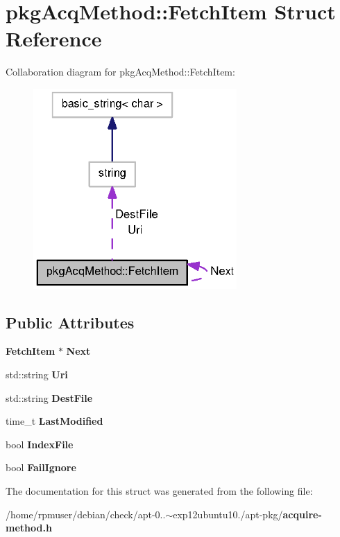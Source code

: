\section{pkg\-Acq\-Method\-:\-:\-Fetch\-Item \-Struct \-Reference}
\label{structpkgAcqMethod_1_1FetchItem}


\-Collaboration diagram for pkg\-Acq\-Method\-:\-:\-Fetch\-Item\-:
\nopagebreak
\begin{figure}[H]
\begin{center}
\leavevmode
\includegraphics[width=220pt]{structpkgAcqMethod_1_1FetchItem__coll__graph}
\end{center}
\end{figure}
\subsection*{\-Public \-Attributes}
\begin{DoxyCompactItemize}
\item 
{\bf \-Fetch\-Item} $\ast$ {\bfseries \-Next}\label{structpkgAcqMethod_1_1FetchItem_a0b400807757f51009e37acd1b0f70d28}

\item 
std\-::string {\bfseries \-Uri}\label{structpkgAcqMethod_1_1FetchItem_a6e12b4b4ffa66bc62635ba43728a446d}

\item 
std\-::string {\bfseries \-Dest\-File}\label{structpkgAcqMethod_1_1FetchItem_ab4b5e2afff64c51303682cea9243f098}

\item 
time\-\_\-t {\bfseries \-Last\-Modified}\label{structpkgAcqMethod_1_1FetchItem_a7715b80087dbd228815c1cf9ff5cc166}

\item 
bool {\bfseries \-Index\-File}\label{structpkgAcqMethod_1_1FetchItem_ac2f65c43a09b70fa0772cfb7274d1b97}

\item 
bool {\bfseries \-Fail\-Ignore}\label{structpkgAcqMethod_1_1FetchItem_a98089f0c724c0e84249b0bae1a6fa8d3}

\end{DoxyCompactItemize}


\-The documentation for this struct was generated from the following file\-:\begin{DoxyCompactItemize}
\item 
/home/rpmuser/debian/check/apt-\/0..$\sim$exp12ubuntu10./apt-\/pkg/{\bf acquire-\/method.\-h}\end{DoxyCompactItemize}
